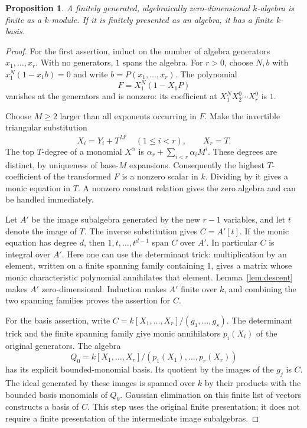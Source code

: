 \documentclass[11pt]{article}
\newtheorem{proposition}[theorem]{Proposition}
\theoremstyle{definition}
\theoremstyle{remark}
\begin{document}
\begin{proposition}\label{prop:finite}
A finitely generated, algebraically zero-dimensional $k$-algebra
is finite as a $k$-module. If it is finitely presented as an algebra,
it has a finite $k$-basis.
\end{proposition}
\begin{proof}
For the first assertion, induct on the number of algebra generators
$x_1,\ldots,x_r$. With no generators, $1$ spans the algebra.
For $r>0$, choose $N,b$ with $x_1^N(1-x_1b)=0$ and write
$b=P(x_1,\ldots,x_r)$. The polynomial
\[
 F=X_1^N(1-X_1P)
\]
vanishes at the generators and is nonzero: its coefficient at
$X_1^N X_2^0\cdots X_r^0$ is $1$.

Choose $M\geq2$ larger than all exponents occurring in $F$. Make the
invertible triangular substitution
\[
 X_i=Y_i+T^{M^i}\quad(1\leq i<r),\qquad X_r=T.
\]
The top $T$-degree of a monomial $X^\alpha$ is
$\alpha_r+\sum_{i<r}\alpha_iM^i$. These degrees are distinct, by
uniqueness of base-$M$ expansions. Consequently the highest
$T$-coefficient of the transformed $F$ is a nonzero scalar in $k$.
Dividing by it gives a monic equation in $T$. A nonzero constant
relation gives the zero algebra and can be handled immediately.

Let $A'$ be the image subalgebra generated by the new $r-1$ variables,
and let $t$ denote the image of $T$. The inverse substitution gives
$C=A'[t]$. If the monic equation has degree $d$, then
$1,t,\ldots,t^{d-1}$ span $C$ over $A'$. In particular $C$ is integral
over $A'$. Here one can use the determinant trick: multiplication by
an element, written on a finite spanning family containing $1$, gives
a matrix whose monic characteristic polynomial annihilates that
element. Lemma~\ref{lem:descent} makes $A'$ zero-dimensional.
Induction makes $A'$ finite over $k$, and combining the two spanning
families proves the assertion for $C$.

For the basis assertion, write
$C=k[X_1,\ldots,X_r]/(g_1,\ldots,g_s)$. The determinant trick and
the finite spanning family give monic annihilators $p_i(X_i)$ of
the original generators. The algebra
\[
 Q_0=k[X_1,\ldots,X_r]/(p_1(X_1),\ldots,p_r(X_r))
\]
has its explicit bounded-monomial basis. Its quotient by the images
of the $g_j$ is $C$. The ideal generated by these images is spanned
over $k$ by their products with the bounded basis monomials of $Q_0$.
Gaussian elimination on this finite list of vectors constructs a basis
of $C$. This step uses the original finite presentation; it does not
require a finite presentation of the intermediate image subalgebras.
\end{proof}
\end{document}
